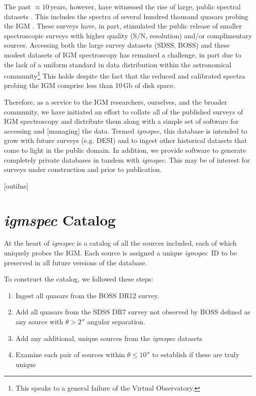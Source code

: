\documentclass[12pt,preprint]{aastex}
\begin{document}
The past $\approx 10$\,years, however, have witnessed the
rise of large, public spectral datasets \citep{york,2dF}.
This includes the spectra of several hundred thousand quasars
probing the IGM \citep{sdss_dr7Q,boss_dr12Q}.
These surveys have, in part, stimulated the public release
of smaller spectroscopic surveys with higher quality
(S/N, resolution) and/or complimentary sources.
Accessing both the large survey datasets (SDSS, BOSS)
and these modest datasets of IGM spectroscopy
has remained a challenge, in part due to the lack of a
uniform standard in data distribution within the astronomical
community\footnote{This speaks to a general failure of the
Virtual Observatory.}
This holds despite the fact that the reduced and calibrated
spectra probing the IGM comprise less than 10\,Gb of disk space.

Therefore, as a service to the IGM researchers, ourselves, and the
broader community, we have initiated an effort to collate 
all of the published surveys of IGM spectroscopy and distribute
them along with a simple set of software for accessing and
[managing] the data.  Termed {\it igmspec}, this database
is intended to grow with future surveys (e.g. DESI)
and to ingest other historical datasets that come to light in
the public domain.  In addition, we provide 
software to generate completely private databases in tandem
with {\it igmspec}.  This may be of interest for surveys 
under construction and prior to publication.

[outilne]




\section{{\it igmspec} Catalog}
\label{sec:catalog}

At the heart of {\it igmspec} is a catalog of all the sources
included, each of which uniquely probes the IGM.
Each source is assigned a unique {\it igmspec}~ID to be
preserved in all future versions of the database.

To construct the catalog, we followed these steps:

\begin{enumerate}
\item Ingest all quasars from the BOSS DR12 survey.
\item Add all quasars from the SDSS DR7 survey not observed by BOSS defined
as any source with $\theta > 2''$ angular separation.
\item Add any additional, unique sources from the {\it igmspec} datasets
\item Examine each pair of sources within $\theta \le 10''$ to establish
if these are truly unique
\end{enumerate}
\end{document}
